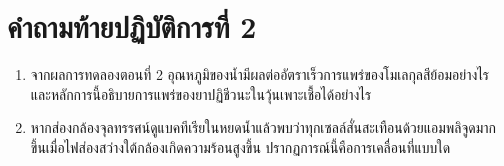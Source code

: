 \section*{คำถามท้ายปฏิบัติการที่ 2}
\begin{enumerate}
    \item จากผลการทดลองตอนที่ 2 อุณหภูมิของน้ำมีผลต่ออัตราเร็วการแพร่ของโมเลกุลสีย้อมอย่างไร และหลักการนี้อธิบายการแพร่ของยาปฏิชีวนะในวุ้นเพาะเชื้อได้อย่างไร
    \item หากส่องกล้องจุลทรรศน์ดูแบคทีเรียในหยดน้ำแล้วพบว่าทุกเซลล์สั่นสะเทือนด้วยแอมพลิจูดมากขึ้นเมื่อไฟส่องสว่างใต้กล้องเกิดความร้อนสูงขึ้น ปรากฏการณ์นี้คือการเคลื่อนที่แบบใด
\end{enumerate}
